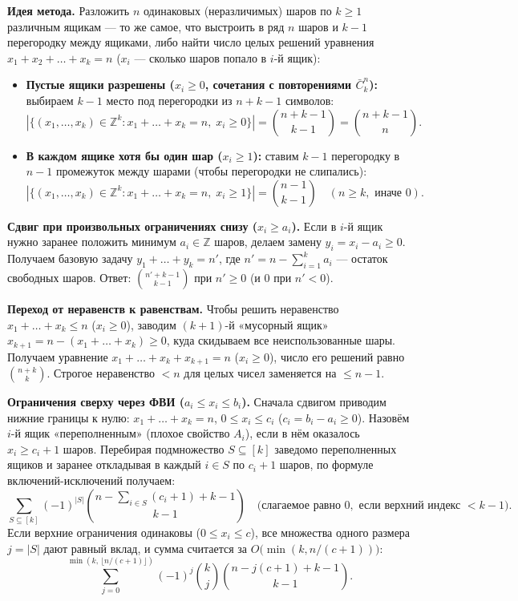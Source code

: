 \documentclass[10pt,a4paper]{article}
\renewcommand{\le}{\leqslant}
\renewcommand{\ge}{\geqslant}
\newcommand{\Z}{\mathbb{Z}}
\begin{document}
\textbf{Идея метода.} Разложить $n$ одинаковых (неразличимых) шаров по $k \ge 1$ различным ящикам — то же самое, что выстроить в ряд $n$ шаров и $k - 1$ перегородку между ящиками, либо найти число целых решений уравнения $x_1 + x_2 + \dots + x_k = n$ ($x_i$ — сколько шаров попало в $i$-й ящик):
\begin{itemize}
  \item \textbf{Пустые ящики разрешены ($x_i \ge 0$, сочетания с повторениями $\bar{C}_k^n$):} выбираем $k - 1$ место под перегородки из $n + k - 1$ символов:
  \[
    |\{(x_1, \dots, x_k) \in \Z^k : x_1 + \dots + x_k = n,\; x_i \ge 0\}| = \binom{n + k - 1}{k - 1} = \binom{n + k - 1}{n}.
  \]
  \item \textbf{В каждом ящике хотя бы один шар ($x_i \ge 1$):} ставим $k - 1$ перегородку в $n - 1$ промежуток между шарами (чтобы перегородки не слипались):
  \[
    |\{(x_1, \dots, x_k) \in \Z^k : x_1 + \dots + x_k = n,\; x_i \ge 1\}| = \binom{n - 1}{k - 1} \quad (n \ge k, \text{ иначе } 0).
  \]
\end{itemize}

\textbf{Сдвиг при произвольных ограничениях снизу ($x_i \ge a_i$).} Если в $i$-й ящик нужно заранее положить минимум $a_i \in \Z$ шаров, делаем замену $y_i = x_i - a_i \ge 0$. Получаем базовую задачу $y_1 + \dots + y_k = n'$, где $n' = n - \sum_{i=1}^k a_i$ — остаток свободных шаров. Ответ: $\binom{n' + k - 1}{k - 1}$ при $n' \ge 0$ (и $0$ при $n' < 0$).

\textbf{Переход от неравенств к равенствам.} Чтобы решить неравенство $x_1 + \dots + x_k \le n$ ($x_i \ge 0$), заводим $(k + 1)$-й «мусорный ящик» $x_{k+1} = n - (x_1 + \dots + x_k) \ge 0$, куда скидываем все неиспользованные шары. Получаем уравнение $x_1 + \dots + x_k + x_{k+1} = n$ ($x_i \ge 0$), число его решений равно $\binom{n + k}{k}$. Строгое неравенство $< n$ для целых чисел заменяется на $\le n - 1$.

\textbf{Ограничения сверху через ФВИ ($a_i \le x_i \le b_i$).} Сначала сдвигом приводим нижние границы к нулю: $x_1 + \dots + x_k = n$, $0 \le x_i \le c_i$ ($c_i = b_i - a_i \ge 0$). Назовём $i$-й ящик «переполненным» (плохое свойство $A_i$), если в нём оказалось $x_i \ge c_i + 1$ шаров. Перебирая подмножество $S \subseteq [k]$ заведомо переполненных ящиков и заранее откладывая в каждый $i \in S$ по $c_i + 1$ шаров, по формуле включений-исключений получаем:
\[
  \sum_{S \subseteq [k]} (-1)^{|S|} \binom{n - \sum_{i \in S}(c_i + 1) + k - 1}{k - 1}
  \quad \bigl(\text{слагаемое равно } 0, \text{ если верхний индекс } < k - 1\bigr).
\]
Если верхние ограничения одинаковы ($0 \le x_i \le c$), все множества одного размера $j = |S|$ дают равный вклад, и сумма считается за $O\bigl(\min(k, n / (c + 1))\bigr)$:
\[
  \sum_{j=0}^{\min(k,\, \lfloor n / (c + 1) \rfloor)} (-1)^j \binom{k}{j} \binom{n - j(c + 1) + k - 1}{k - 1}.
\]
\end{document}
